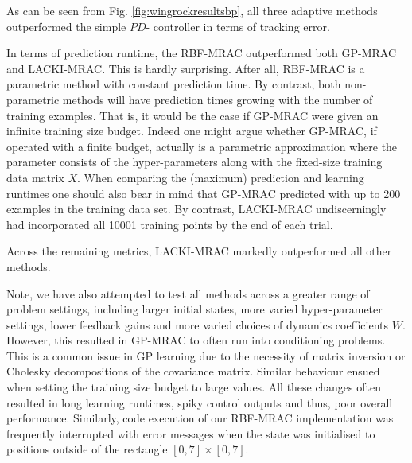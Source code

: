 	
	
	
	
	As can be seen from Fig. \ref{fig:wingrockresultsbp}, all three adaptive methods outperformed the simple $PD$- controller in terms of tracking error. 
	
	In terms of prediction runtime, the RBF-MRAC outperformed both GP-MRAC and LACKI-MRAC. This is hardly surprising. After all, RBF-MRAC is a parametric method with constant prediction time. By contrast, both non-parametric methods will have prediction times growing with the number of training examples.
That is, it would be the case if GP-MRAC were given an infinite training size budget. Indeed one might argue whether GP-MRAC, if operated with a finite budget, actually is a parametric approximation where the parameter consists of the hyper-parameters along with the fixed-size training data matrix $X$. When comparing the (maximum) prediction and learning runtimes one should also bear in mind that GP-MRAC predicted with up to 200 examples in the training data set. By contrast, LACKI-MRAC undiscerningly had incorporated all 10001 training points by the end of each trial.

Across the remaining metrics, LACKI-MRAC markedly outperformed all other methods.

Note, we have also attempted to test all methods across a greater range of problem settings, including larger initial states, more varied hyper-parameter settings, lower feedback gains and more varied choices of dynamics coefficients $W$. However, this resulted in GP-MRAC to often run into conditioning problems. This is a common issue in GP learning due to the necessity of matrix inversion or Cholesky decompositions of the covariance matrix. Similar behaviour ensued when setting the training size budget to large values. All these changes often resulted in long learning runtimes, spiky control outputs and thus, poor overall performance. Similarly, code execution of our RBF-MRAC implementation was frequently interrupted with error messages when the state was initialised to positions outside of the rectangle $[0,7] \times [0,7]$.

